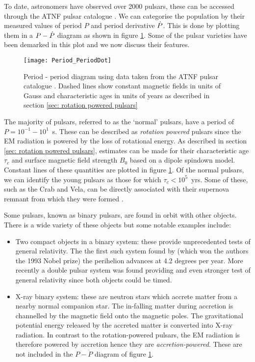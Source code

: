 To date, astronomers have observed over 2000 pulsars, these can be accessed
through the ATNF pulsar catalogue \citet{ATNF}. We can categorise the population
by their measured values of period $P$ and period derivative $\dot{P}$. This is
done by plotting them in a $P - \dot{P}$ diagram as shown
in figure \ref{fig: Period_PeriodDot}. Some of the pulsar varieties have been 
demarked in this plot and we now discuss their features. 

\begin{figure}[hb]
    \centering
    \texttt{[image: Period\_PeriodDot]}
    \caption{Period - period diagram using data taken from the ATNF pulsar 
             catalogue \citep{ATNF}. Dashed lines show constant magnetic fields
         in units of Gauss and characteristic ages in units of years as described
     in section \ref{sec: rotation powered pulsars}}
    \label{fig: Period_PeriodDot}
\end{figure} 

The majority of pulsars, referred to as the `normal' pulsars, have a period of
$P=10^{-1}-10^{1}$~s. These can be described as \emph{rotation powered} pulsars
since the EM radiation is powered by the loss of rotational energy. As
described in section \ref{sec: rotation powered pulsars}, estimates can be made
for their characteristic age $\tau_{c}$ and surface magnetic field strength
$B_{0}$ based on a dipole spindown model. Constant lines of these quantities
are plotted in figure \ref{fig: Period_PeriodDot}. Of the normal pulsars, we
can identify the young pulsars as those for which $\tau_{c}<10^{5}$~yrs. Some
of these, such as the Crab and Vela, can be directly associated with their
supernova remnant from which they were formed \citep{Kaspi1996}. 

Some pulsars, known as binary pulsars, are found in orbit with other objects.
There is a wide variety of these objects but some notable examples include:
\begin{itemize}

    \item Two compact objects in a binary system: these provide unprecedented
        tests of general relativity. The
        the first such system found by \citet{Hulse1975} (which won the authors the 1993 Nobel prize)
        the perihelion advances at 4.2 degrees per year. More recently a double
        pulsar system \citep{KramerStairs2006} was found providing and even
        stronger test of general relativity since both objects could be timed.

     \item X-ray binary system: these are neutron stars which accrete matter
     from a nearby normal companion star. The in-falling matter during
     accretion is channelled by the magnetic field onto the magnetic poles.
     The gravitational potential energy released by the accreted matter is
     converted into X-ray radiation. In contrast to the rotation-powered
     pulsars, the EM radiation is therefore powered by accretion hence they are
     \emph{accretion-powered}. These are not included in the $P-\dot{P}$
     diagram of figure \ref{fig: Period_PeriodDot}.

\end{itemize}

